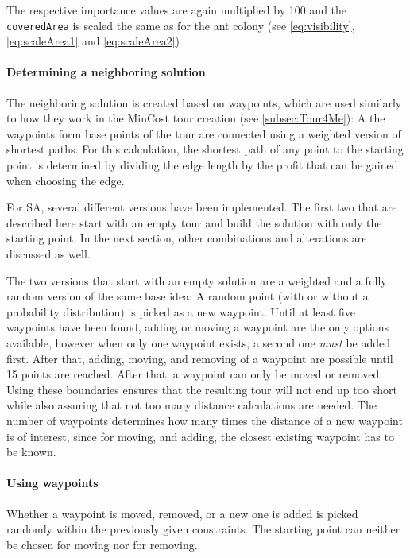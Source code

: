 The respective importance values are again multiplied by 100 and the  \texttt{coveredArea} is scaled the same as for the ant colony (see \ref{eq:visibility}, \ref{eq:scaleArea1} and \ref{eq:scaleArea2})

\paragraph{Determining a neighboring solution}

The neighboring solution is created based on waypoints, which are used similarly to how they work in the MinCost tour creation (see \ref{subsec:Tour4Me}):
A the waypoints form base points of the tour are connected using a weighted version of shortest paths. 
For this calculation, the shortest path of any point to the starting point is determined by dividing the edge length by the profit that can be gained when choosing the edge. 

For SA, several different versions have been implemented.
The first two that are described here start with an empty tour and build the solution with only the starting point.
In the next section, other combinations and alterations are discussed as well.

The two versions that start with an empty solution are a weighted and a fully random version of the same base idea:
A random point (with or without a probability distribution) is picked as a new waypoint. 
Until at least five waypoints have been found, adding or moving a waypoint are the only options available, however when only one waypoint exists, a second one \textit{must} be added first.
After that, adding, moving, and removing of a waypoint are possible until 15 points are reached.
After that, a waypoint can only be moved or removed.
Using these boundaries ensures that the resulting tour will not end up too short while also assuring that not too many distance calculations are needed.
The number of waypoints determines how many times the distance of a new waypoint is of interest, since for moving, and adding, the closest existing waypoint has to be known.

\paragraph{Using waypoints}

Whether a waypoint is moved, removed, or a new one is added is picked randomly within the previously given constraints.
The starting point can neither be chosen for moving nor for removing.

